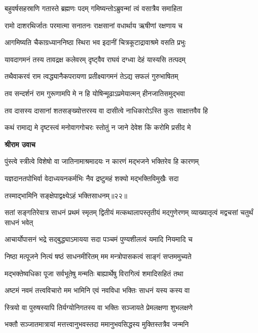 \twolineshloka
{बहुवर्षसहस्राणि गतास्ते ब्रह्मणः पदम्}
{गमिष्यन्तोऽब्रुवन्मां त्वं वसात्रैव समाहिता} %

\twolineshloka
{रामो दाशरथिर्जातः परमात्मा सनातनः}
{राक्षसानां वधार्थाय ऋषीणां रक्षणाय च} %

\twolineshloka
{आगमिष्यति चैकाग्रध्याननिष्ठा स्थिरा भव}
{इदानीं चित्रकूटाद्रावाश्रमे वसति प्रभुः} %

\twolineshloka
{यावदागमनं तस्य तावद्रक्ष कलेवरम्}
{दृष्ट्वैव राघवं दग्ध्वा देहं यास्यसि तत्पदम्} %

\twolineshloka
{तथैवाकरवं राम त्वद्ध्यानैकपरायणा}
{प्रतीक्ष्यागमनं तेऽद्य सफलं गुरुभाषितम्} %

\twolineshloka
{तव सन्दर्शनं राम गुरूणामपि मे न हि}
{योषिन्मूढाऽप्रमेयात्मन् हीनजातिसमुद्भवा} %

\twolineshloka
{तव दासस्य दासानां शतसङ्ख्योत्तरस्य वा}
{दासीत्वे नाधिकारोऽस्ति कुतः साक्षात्तवैव हि} %

\twolineshloka
{कथं रामाद्य मे दृष्टस्त्वं मनोवागगोचरः}
{स्तोतुं न जाने देवेश किं करोमि प्रसीद मे} %

\textbf{श्रीराम उवाच}

\twolineshloka
{पुंस्त्वे स्त्रीत्वे विशेषो वा जातिनामाश्रमादयः}
{न कारणं मद्भजने भक्तिरेव हि कारणम्} %

\twolineshloka
{यज्ञदानतपोभिर्वा वेदाध्ययनकर्मभिः}
{नैव द्रष्टुमहं शक्यो मद्भक्तिविमुखैः सदा} %

{तस्माद्भामिनि सङ्क्षेपाद्वक्ष्येऽहं भक्तिसाधनम्॥२२॥} %


\threelineshloka
{सतां सङ्गतिरेवात्र साधनं प्रथमं स्मृतम्}
{द्वितीयं मत्कथालापस्तृतीयं मद्गुणेरणम्}
{व्याख्यातृत्वं मद्वचसां चतुर्थं साधनं भवेत्} %

\twolineshloka
{आचार्योपासनं भद्रे सद्बुद्ध्याऽमायया सदा}
{पञ्चमं पुण्यशीलत्वं यमादि नियमादि च} %

\twolineshloka
{निष्ठा मत्पूजने नित्यं षष्ठं साधनमीरितम्}
{मम मन्त्रोपासकत्वं साङ्गं सप्तममुच्यते} %

\twolineshloka
{मद्भक्तेष्वधिका पूजा सर्वभूतेषु मन्मतिः}
{बाह्यार्थेषु विरागित्वं शमादिसहितं तथा} %

\twolineshloka
{अष्टमं नवमं तत्त्वविचारो मम भामिनि}
{एवं नवविधा भक्तिः साधनं यस्य कस्य वा} %

\twolineshloka
{स्त्रियो वा पुरुषस्यापि तिर्यग्योनिगतस्य वा}
{भक्तिः सञ्जायते प्रेमलक्षणा शुभलक्षणे} %

\twolineshloka
{भक्तौ सञ्जातमात्रायां मत्तत्त्वानुभवस्तदा}
{ममानुभवसिद्धस्य मुक्तिस्तत्रैव जन्मनि} %

